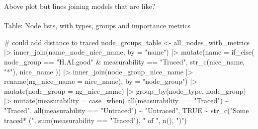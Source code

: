 \documentclass[
  letterpaper,
  DIV=11,
  numbers=noendperiod]{scrartcl}
\makeatletter
\let\oldparagraph\paragraph
\renewcommand{\paragraph}{
    \@ifstar
      \xxxParagraphStar
      \xxxParagraphNoStar
  }
\newcommand{\xxxParagraphStar}[1]{\oldparagraph*{#1}\mbox{}}
\newcommand{\xxxParagraphNoStar}[1]{\oldparagraph{#1}\mbox{}}
\newenvironment{Shaded}{\begin{snugshade}}{\end{snugshade}}
\newcommand{\AttributeTok}[1]{\textcolor[rgb]{0.40,0.45,0.13}{#1}}
\newcommand{\CommentTok}[1]{\textcolor[rgb]{0.37,0.37,0.37}{#1}}
\newcommand{\ConstantTok}[1]{\textcolor[rgb]{0.56,0.35,0.01}{#1}}
\newcommand{\FunctionTok}[1]{\textcolor[rgb]{0.28,0.35,0.67}{#1}}
\newcommand{\NormalTok}[1]{\textcolor[rgb]{0.00,0.23,0.31}{#1}}
\newcommand{\OtherTok}[1]{\textcolor[rgb]{0.00,0.23,0.31}{#1}}
\newcommand{\SpecialCharTok}[1]{\textcolor[rgb]{0.37,0.37,0.37}{#1}}
\newcommand{\StringTok}[1]{\textcolor[rgb]{0.13,0.47,0.30}{#1}}
\makeatother
\begin{document}
Above plot but lines joining models that are like?

\paragraph{Table: Node lists, with types, groups and importance
metrics}\label{table-node-lists-with-types-groups-and-importance-metrics}

\begin{Shaded}
\begin{Highlighting}[]
\CommentTok{\# could add distance to traced}
\NormalTok{node\_groups\_table }\OtherTok{\textless{}{-}} 
\NormalTok{    all\_nodes\_with\_metrics }\SpecialCharTok{|\textgreater{}}
    \FunctionTok{inner\_join}\NormalTok{(name\_node\_nice\_name, }\AttributeTok{by =} \StringTok{"name"}\NormalTok{) }\SpecialCharTok{|\textgreater{}} 
    \FunctionTok{mutate}\NormalTok{(}\AttributeTok{name =} \FunctionTok{if\_else}\NormalTok{(}
\NormalTok{        node\_group }\SpecialCharTok{==} \StringTok{"H.AI.good"} \SpecialCharTok{\&}\NormalTok{ measurability }\SpecialCharTok{==} \StringTok{"Traced"}\NormalTok{,}
        \FunctionTok{str\_c}\NormalTok{(nice\_name, }\StringTok{"*"}\NormalTok{),}
\NormalTok{        nice\_name}
\NormalTok{    )) }\SpecialCharTok{|\textgreater{}} 
    \FunctionTok{inner\_join}\NormalTok{(node\_group\_nice\_name }\SpecialCharTok{|\textgreater{}} \FunctionTok{rename}\NormalTok{(}\AttributeTok{ng\_nice\_name =}\NormalTok{ nice\_name), }\AttributeTok{by =} \StringTok{"node\_group"}\NormalTok{) }\SpecialCharTok{|\textgreater{}} 
    \FunctionTok{mutate}\NormalTok{(}\AttributeTok{node\_group =}\NormalTok{ ng\_nice\_name) }\SpecialCharTok{|\textgreater{}} 
    \FunctionTok{group\_by}\NormalTok{(node\_type, node\_group) }\SpecialCharTok{|\textgreater{}}
    \FunctionTok{mutate}\NormalTok{(}\AttributeTok{measurability =} \FunctionTok{case\_when}\NormalTok{(}
        \FunctionTok{all}\NormalTok{(measurability }\SpecialCharTok{==} \StringTok{"Traced"}\NormalTok{) }\SpecialCharTok{\textasciitilde{}} \StringTok{"Traced"}\NormalTok{,}
        \FunctionTok{all}\NormalTok{(measurability }\SpecialCharTok{==} \StringTok{"Untraced"}\NormalTok{) }\SpecialCharTok{\textasciitilde{}} \StringTok{"Untraced"}\NormalTok{,}
        \ConstantTok{TRUE} \SpecialCharTok{\textasciitilde{}} \FunctionTok{str\_c}\NormalTok{(}\StringTok{"Some traced* ("}\NormalTok{, }\FunctionTok{sum}\NormalTok{(measurability }\SpecialCharTok{==} \StringTok{"Traced"}\NormalTok{), }\StringTok{" of "}\NormalTok{, }\FunctionTok{n}\NormalTok{(), }\StringTok{")"}\NormalTok{)}

\end{Highlighting}
\end{Shaded}
\end{document}
